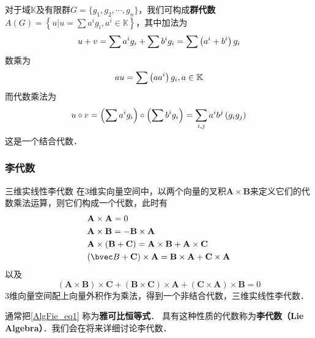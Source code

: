 \begin{example}{}
对于域$\mathbb{K} $及有限群$G=\{g_1,g_2,\cdots,g_n\}$，我们可构成\textbf{群代数}$\displaystyle A(G)=\left\{u | u=\sum a^{i} g_{i}, a^{i} \in \mathbb{K}\right\}$，其中加法为
\begin{equation}
u+v=\sum a^{i} g_{i}+\sum b^{i} g_{i}=\sum\left(a^{i}+b^{i}\right) g_{i} \notag
\end{equation}
数乘为
\begin{equation}
a u=\sum\left(a a^{i}\right) g_{i}, a \in \mathbb{K} \notag
\end{equation}
而代数乘法为
\begin{equation}
u \circ v=\left(\sum a^{i} g_{i}\right) \circ\left(\sum b^{i} g_{i}\right)=\sum_{i, j} a^{i} b^{j}\left(g_{i} g_{j}\right) \notag
\end{equation}
这是一个结合代数．
\end{example}

\subsubsection{李代数}

\begin{example}{三维实线性李代数}
在$3$维实向量空间中，以两个向量的叉积$\mathbf A\times \mathbf B$来定义它们的代数乘法运算，则它们构成一个代数，此时有
\begin{equation}
\begin{aligned}
&\mathbf{A} \times \mathbf{A}=0\\
&\mathbf{A} \times \mathbf{B}=-\mathbf{B} \times \mathbf{A}\\
&\mathbf{A} \times(\mathbf{B}+\mathbf{C})=\mathbf{A} \times \mathbf{B}+\mathbf{A} \times \mathbf{C}\\
&(\bvec B+\mathbf{C}) \times \mathbf{A}=\mathbf{B} \times \mathbf{A}+\mathbf{C} \times \mathbf{A}
\end{aligned}
\end{equation}
以及
\begin{equation} \label{AlgFie_eq1}
(\mathbf{A} \times \mathbf{B}) \times \mathbf{C}+(\mathbf{B} \times \mathbf{C}) \times \mathbf{A}+(\mathbf{C} \times \mathbf{A}) \times \mathbf{B}=0
\end{equation}
$3$维向量空间配上向量外积作为乘法，得到一个非结合代数，三维实线性李代数．
\end{example}

通常把\autoref{AlgFie_eq1} 称为\textbf{雅可比恒等式}． 具有这种性质的代数称为\textbf{李代数（Lie Algebra）}．我们会在将来详细讨论李代数．

